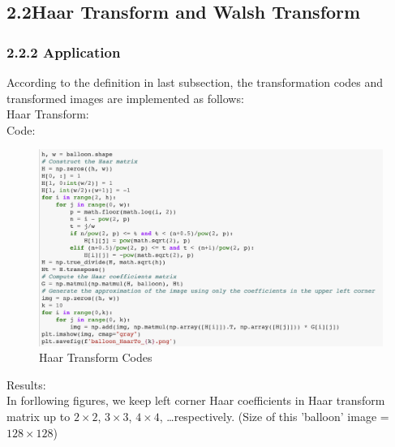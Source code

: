 \documentclass[12pt]{article}
\begin{document}
\subsection*{2.2\quad Haar Transform and Walsh Transform}

\subsubsection*{2.2.2 \quad Application}
According to the definition in last subsection, the transformation codes and transformed images are implemented as follows:\\
Haar Transform:\\
Code:
\begin{figure}[H]
    \centering
    \includegraphics[width=1\textwidth]{haar_code.png}
    \caption{Haar Transform Codes}
\end{figure}
\begin{flushleft}
Results:\\
In forllowing figures, we keep left corner Haar coefficients in Haar transform matrix up to  $2 \times 2$, 
$3 \times 3$, $4 \times 4$, \dots respectively.
(Size of this 'balloon' image = $128 \times 128$)
\end{flushleft}
\end{document}
